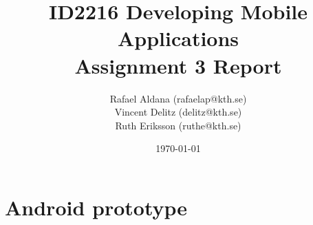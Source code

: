 \documentclass[11pt,twoside,a4paper]{report}
\begin{document}
\title{ID2216 Developing Mobile Applications\\Assignment 3 Report}
\author{Rafael Aldana (rafaelap@kth.se)\\Vincent Delitz (delitz@kth.se)\\Ruth Eriksson (ruthe@kth.se)}
\date{\today}
\maketitle



\tableofcontents
\thispagestyle{empty}



\renewcommand{\chaptername}{Assignment}
\setcounter{chapter}{2}
\chapter{Android prototype}
\setcounter{page}{1}
\end{document}

